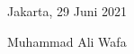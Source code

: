 \lipsum[1-3]

	\vskip 3cm
	\hspace{10cm} Jakarta, 29 Juni 2021 \par
	\vskip 3cm
	\hspace{10cm} Muhammad Ali Wafa